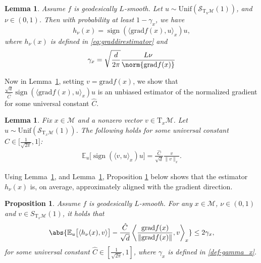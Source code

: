 \documentclass{article}
\newcommand{\rgrad}{\mathrm{grad}}
\newcommand{\pert}{\nu}
\theoremstyle{plain}
\newtheorem{proposition}[theorem]{Proposition}
\newtheorem{lemma}[theorem]{Lemma}
\theoremstyle{definition}
\theoremstyle{remark}
\begin{document}
\begin{lemma}\label{lem:grad_with_bias}
Assume $f$ is geodesically $L$-smooth. Let $u \sim \mathrm{Unif(\mathcal{S}_{\mathrm{T}_x\mathcal{M}}(1))}$, and $\pert \in (0,1)$. Then with probability at least $1 - \gamma_x$, we have 
\begin{equation*}
h_{\pert}(x)
= \operatorname{sign}(\langle\rgrad f(x), u\rangle_x)  u,
\end{equation*}
where $h_{\pert}(x)$ is defined in \eqref{eq:graddirestimator} and 
\begin{equation}\label{def-gamma_x}
\gamma_x = \sqrt{\frac{d}{2\pi}}\frac{{L}\pert}{\norm{\rgrad f(x)}}
\end{equation}
\end{lemma}
Now in Lemma~\ref{lem:estimating_normalized_gradient}, setting $v=\rgrad f(x)$, we show that $ \frac{\sqrt{d}}{\hat{C}}\operatorname{sign}(\langle \rgrad f(x),u\rangle_x)u$ is an unbiased estimator of the normalized gradient for some universal constant $\hat{C}$. 
\begin{lemma}\label{lem:estimating_normalized_gradient}
Fix $x\in\mathcal{M}$ and a nonzero vector $v\in \mathrm{T}_x\mathcal{M}$. 
Let $u\sim\mathrm{Unif}(\mathcal{S}_{\mathrm{T}_x\mathcal{M}}(1))$.  
The following holds for some universal constant $\hat{C} \in \big[\frac{1}{\sqrt{2\pi}},1\big]$:
\begin{align}\label{lem:estimating_normalized_gradient-eq}
    \mathbb{E}_u\big[\operatorname{sign}(\langle v,u\rangle_x)u\big]
= \frac{\hat{C}}{\sqrt{d}}\frac{v}{\|v\|_x}.
\end{align}
\end{lemma}
Using Lemma~\ref{lem:grad_with_bias}, and Lemma~\ref{lem:estimating_normalized_gradient}, Proposition \ref{prop:estimate_biased_NG} below shows that the estimator $h_\pert(x)$ is, on average, approximately aligned with the gradient direction.
\begin{proposition}\label{prop:estimate_biased_NG}
Assume $f$ is geodesically $L$-smooth. For any $x\in\mathcal{M}$, $\nu\in (0,1)$ and $v\in S_{\mathrm{T}_x\mathcal{M}}(1)$, it holds that 
\begin{equation*}
\abs{\mathbb{E}_u\bigl[ \langle h_\pert(x), v\rangle\bigr]-\frac{\hat{C}}{\sqrt{d}}
\left\langle\frac{\rgrad f(x)}{\|\rgrad f(x)\|},v\right\rangle_x }
\le 2\gamma_x,
\end{equation*}
for some universal constant $\hat{C}\in[\frac{1}{\sqrt{2\pi}},1]$, where $\gamma_x$ is defined in \eqref{def-gamma_x}. 
\end{proposition}
\end{document}
